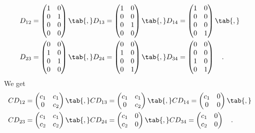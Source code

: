 \begin{align*}
D_{12} &= \begin{pmatrix} 1 & 0 \\ 0 & 1 \\ 0 & 0 \\ 0 & 0 \end{pmatrix} \tab{,}
D_{13} = \begin{pmatrix} 1 & 0 \\ 0 & 0 \\ 0 & 1 \\ 0 & 0 \end{pmatrix} \tab{,}
D_{14} = \begin{pmatrix} 1 & 0 \\ 0 & 0 \\ 0 & 0 \\ 0 & 1 \end{pmatrix} \tab{,} \\
D_{23} &= \begin{pmatrix} 0 & 0 \\ 1 & 0 \\ 0 & 1 \\ 0 & 0 \end{pmatrix} \tab{,}
D_{24} = \begin{pmatrix} 0 & 0 \\ 1 & 0 \\ 0 & 0 \\ 0 & 1 \end{pmatrix} \tab{,}
D_{34} = \begin{pmatrix} 0 & 0 \\ 0 & 0 \\ 1 & 0 \\ 0 & 1 \end{pmatrix} \quad .
\end{align*}
We get
\begin{align*}
CD_{12} &= \begin{pmatrix} c_1 & c_1 \\ 0 & c_2 \end{pmatrix} \tab{,}
CD_{13} = \begin{pmatrix} c_1 & c_1 \\ 0 & c_2  \end{pmatrix} \tab{,}
CD_{14} = \begin{pmatrix} c_1 & 0 \\ 0 & 0      \end{pmatrix} \tab{,} \\
CD_{23} &= \begin{pmatrix} c_1 & c_1 \\ c_2 & c_2 \end{pmatrix} \tab{,}
CD_{24} = \begin{pmatrix} c_1 & 0 \\ c_2 & 0    \end{pmatrix} \tab{,}
CD_{34} = \begin{pmatrix} c_1 & 0 \\ c_2 & 0   \end{pmatrix} \quad .
\end{align*}
